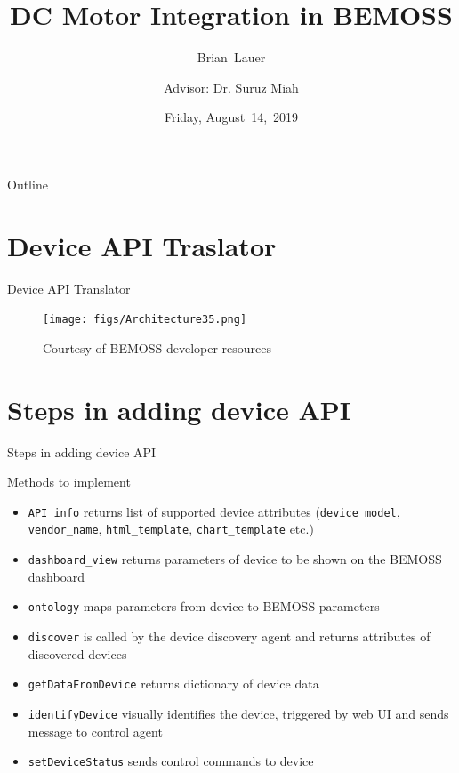 \documentclass{beamer}
\title[DC Motor Integration]{DC Motor Integration in BEMOSS}
\author[B.~Lauer]{Brian~Lauer\\\and
Advisor: Dr. Suruz Miah}
\institute[Bradley University] %
{
  Department of Electrical and Computer Engineering\\
  Bradley University\\
  1501 W. Bradley Avenue\\
  Peoria, IL, 61625, USA
}
\date[August~16,~2019]{Friday, August~14,~2019}
\begin{document}
\begin{frame}
  \titlepage
\end{frame}

\begin{frame}{Outline}
  \tableofcontents
\end{frame}

\section{Device API Traslator}


\begin{frame}{Device API Translator}{}
\begin{figure}
\texttt{[image: figs/Architecture35.png]}
\caption{Courtesy of BEMOSS developer resources}
\end{figure}
\end{frame}

\section{Steps in adding device API}

\begin{frame}{Steps in adding device API}{}
\begin{block}{Methods to implement}
\begin{itemize}
	\item \texttt{API\_info} returns list of supported device attributes (\texttt{device\_model}, \texttt{vendor\_name}, \texttt{html\_template}, \texttt{chart\_template} etc.)
	\item \texttt{dashboard\_view} returns parameters of device to be shown on the BEMOSS dashboard
	\item \texttt{ontology} maps parameters from device to BEMOSS parameters
	\item \texttt{discover} is called by the device discovery agent and returns attributes of discovered devices
	\item \texttt{getDataFromDevice} returns dictionary of device data
	\item \texttt{identifyDevice} visually identifies the device, triggered by web UI and sends message to control agent
	\item \texttt{setDeviceStatus} sends control commands to device
\end{itemize}
\end{block}
\end{frame}
\end{document}
